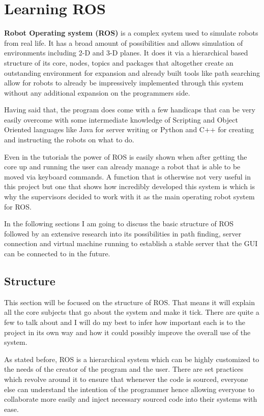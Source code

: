 \documentclass{report}
\begin{document}
  \chapter{Learning ROS}

  \textbf{Robot Operating system (ROS)} is a complex system used to simulate robots from real life. It has a broad amount of possibilities and allows simulation of environments including 2-D and 3-D planes. It does it via a hierarchical based structure of its core, nodes, topics and packages that altogether create an outstanding environment for expansion and already built tools like path searching allow for robots to already be impressively implemented through this system without any additional expansion on the programmers side.

  Having said that, the program does come with a few handicaps that can be very easily overcome with some intermediate knowledge of Scripting and Object Oriented languages like Java for server writing or Python and C++ for creating and instructing the robots on what to do.

  Even in the tutorials the power of ROS is easily shown when after getting the core up and running the user can already manage a robot that is able to be moved via keyboard commands. A function that is otherwise not very useful in this project but one that shows how incredibly developed this system is which is why the supervisors decided to work with it as the main operating robot system for ROS.

  In the following sections I am going to discuss the basic structure of ROS followed by an extensive research into its possibilities in path finding, server connection and virtual machine running to establish a stable server that the GUI can be connected to in the future.

    \section{Structure}

    This section will be focused on the structure of ROS. That means it will explain all the core subjects that go about the system and make it tick. There are quite a few to talk about and I will do my best to infer how important each is to the project in its own way and how it could possibly improve the overall use of the system.

    As stated before, ROS is a hierarchical system which can be highly customized to the needs of the creator of the program and the user. There are set practices which revolve around it to ensure that whenever the code is sourced, everyone else can understand the intention of the programmer hence allowing everyone to collaborate more easily and inject necessary sourced code into their systems with ease. 
\end{document}

